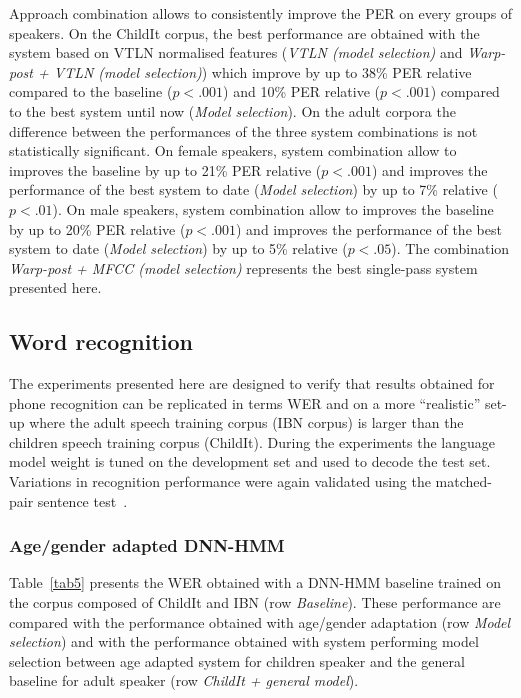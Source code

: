 \documentclass{nle}
\begin{document}
Approach  combination allows to consistently improve the PER on every groups of speakers. On the ChildIt corpus, the best performance are obtained with the system based on VTLN normalised features ({\em VTLN (model selection)} and {\em Warp-post + VTLN (model selection)}) which improve by up to 38\% PER relative compared to the baseline ($p  <.001$) and 10\% PER relative ($p  <.001$) compared to the best system until now ({\em Model selection}). On the adult corpora the difference between the performances of the three system combinations is not statistically significant. On female speakers, system combination allow to improves the baseline by up to 21\% PER relative ($p  <.001$) and improves the performance of the best system to date ({\em Model selection}) by up to 7\% relative ($p  <.01$). On male speakers, system combination allow to improves the baseline by up to 20\% PER relative ($p  <.001$) and improves the performance of the best system to date ({\em Model selection}) by up to 5\% relative ($p  <.05$). The combination {\em Warp-post + MFCC (model selection)} represents the best single-pass system presented here.


\subsection{Word recognition}
The experiments presented here are designed to verify that results obtained for phone recognition can be replicated  in terms WER and on a more ``realistic'' set-up where the adult speech training corpus (IBN corpus) is larger than the children speech training corpus (ChildIt). During the experiments the language model weight is tuned on the development set and used to decode the test set. Variations  in recognition performance were again validated using the matched-pair  sentence test~\citep{GilCox89}. 
\subsubsection{Age/gender adapted DNN-HMM}
Table~\ref{tab5} presents the WER obtained with a DNN-HMM  baseline trained on the corpus composed of ChildIt and IBN (row  {\em  Baseline}). These performance are compared with the performance obtained with age/gender adaptation (row {\em Model selection}) and with the performance obtained with system performing model selection between age adapted system for children speaker and the general baseline for adult speaker (row {\em ChildIt + general model}).
\end{document}
